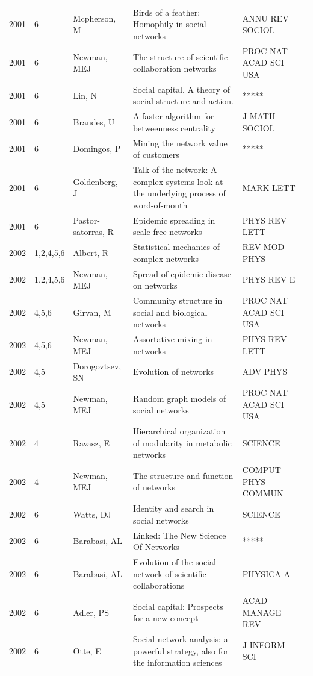 \documentclass[11pt]{article} %
\begin{document}
\begin{longtable}{p{0.8cm}|p{1.25cm}|p{2.8cm}|p{7.5cm}|p{3cm}l}
2001&	6&	Mcpherson, M&	 Birds of a feather: Homophily in social networks&         	ANNU REV SOCIOL\\
2001&	6&	Newman, MEJ&	 The structure of scientific collaboration networks&         	PROC NAT ACAD SCI USA\\
2001&	6&	Lin, N&	 Social capital. A theory of social structure and action.&         	*****\\
2001&	6&	Brandes, U&	 A faster algorithm for betweenness centrality&         	J MATH SOCIOL\\
2001&	6&	Domingos, P&	 Mining the network value of customers&         	*****\\
2001&	6&	Goldenberg, J&	 Talk of the network: A complex systems look at the underlying process of word-of-mouth&         	MARK LETT\\
2001&	6&	Pastor-satorras, R&	 Epidemic spreading in scale-free networks&         	PHYS REV LETT\\
2002&	1,2,4,5,6&	Albert, R&	 Statistical mechanics of complex networks&         	REV MOD PHYS\\
2002&	1,2,4,5,6&	Newman, MEJ&	 Spread of epidemic disease on networks&         	PHYS REV E\\
2002&	4,5,6&	Girvan, M&	 Community structure in social and biological networks&         	PROC NAT ACAD SCI USA\\
2002&	4,5,6&	Newman, MEJ&	 Assortative mixing in networks&         	PHYS REV LETT\\
2002&	4,5&	Dorogovtsev, SN&	 Evolution of networks&         	ADV PHYS\\
2002&	4,5&	Newman, MEJ&	 Random graph models of social networks&         	PROC NAT ACAD SCI USA\\
2002&	4&	Ravasz, E&	 Hierarchical organization of modularity in metabolic networks&         	SCIENCE\\
2002&	4&	Newman, MEJ&	 The structure and function of networks&         	COMPUT PHYS COMMUN\\
2002&	6&	Watts, DJ&	 Identity and search in social networks&         	SCIENCE\\
2002&	6&	Barabasi, AL &	 Linked: The New Science Of Networks&         	*****\\
2002&	6&	Barabasi, AL&	 Evolution of the social network of scientific collaborations&         	PHYSICA A\\
2002&	6&	Adler, PS&	 Social capital: Prospects for a new concept&         	ACAD MANAGE REV\\
2002&	6&	Otte, E&	 Social network analysis: a powerful strategy, also for the information sciences&         	J INFORM SCI\\

\end{longtable}
\end{document}
